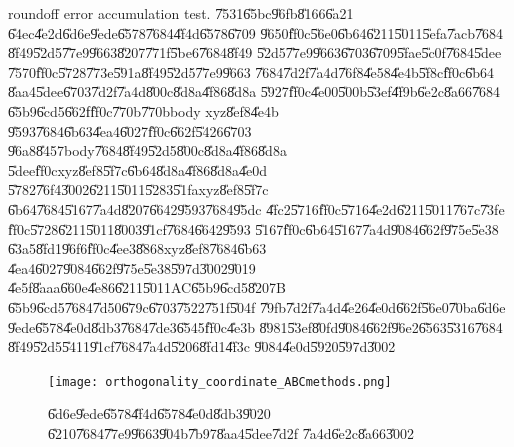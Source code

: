 \begin{case}
roundoff error accumulation test. \U{7531}\U{65bc}\U{96fb}\U{8166}\U{6a21}%
\U{64ec}\U{4e2d}\U{6d6e}\U{9ede}\U{6578}\U{7684}\U{4f4d}\U{6578}\U{6709}%
\U{9650}\U{ff0c}\U{56e0}\U{6b64}\U{6211}\U{5011}\U{5efa}\U{7acb}\U{7684}%
\U{8f49}\U{52d5}\U{77e9}\U{9663}\U{8207}\U{771f}\U{5be6}\U{7684}\U{8f49}%
\U{52d5}\U{77e9}\U{9663}\U{6703}\U{6709}\U{5fae}\U{5c0f}\U{7684}\U{5dee}%
\U{7570}\U{ff0c}\U{5728}\U{773e}\U{591a}\U{8f49}\U{52d5}\U{77e9}\U{9663}%
\U{7684}\U{7d2f}\U{7a4d}\U{76f8}\U{4e58}\U{4e4b}\U{5f8c}\U{ff0c}\U{6b64}%
\U{8aa4}\U{5dee}\U{6703}\U{7d2f}\U{7a4d}\U{800c}\U{8d8a}\U{4f86}\U{8d8a}%
\U{5927}\U{ff0c}\U{4e00}\U{500b}\U{53ef}\U{4f9b}\U{6e2c}\U{8a66}\U{7684}%
\U{65b9}\U{6cd5}\U{662f}\U{ff0c}\U{770b}\U{770b}body xyz\U{8ef8}\U{4e4b}%
\U{9593}\U{7684}\U{6b63}\U{4ea4}\U{6027}\U{ff0c}\U{662f}\U{5426}\U{6703}%
\U{96a8}\U{8457}body\U{7684}\U{8f49}\U{52d5}\U{800c}\U{8d8a}\U{4f86}\U{8d8a}%
\U{5dee}\U{ff0c}xyz\U{8ef8}\U{5f7c}\U{6b64}\U{8d8a}\U{4f86}\U{8d8a}\U{4e0d}%
\U{5782}\U{76f4}\U{3002}\U{6211}\U{5011}\U{5283}\U{51fa}xyz\U{8ef8}\U{5f7c}%
\U{6b64}\U{7684}\U{5167}\U{7a4d}\U{8207}\U{6642}\U{9593}\U{7684}\U{95dc}%
\U{4fc2}\U{5716}\U{ff0c}\U{5716}\U{4e2d}\U{6211}\U{5011}\U{767c}\U{73fe}%
\U{ff0c}\U{5728}\U{6211}\U{5011}\U{8003}\U{91cf}\U{7684}\U{6642}\U{9593}%
\U{5167}\U{ff0c}\U{6b64}\U{5167}\U{7a4d}\U{9084}\U{662f}\U{975e}\U{5e38}%
\U{63a5}\U{8fd1}\U{96f6}\U{ff0c}\U{4ee3}\U{8868}xyz\U{8ef8}\U{7684}\U{6b63}%
\U{4ea4}\U{6027}\U{9084}\U{662f}\U{975e}\U{5e38}\U{597d}\U{3002}\U{9019}%
\U{4e5f}\U{8aaa}\U{660e}\U{4e86}\U{6211}\U{5011}AC\U{65b9}\U{6cd5}\U{8207}B%
\U{65b9}\U{6cd5}\U{7684}\U{7d50}\U{679c}\U{6703}\U{7522}\U{751f}\U{504f}%
\U{79fb}\U{7d2f}\U{7a4d}\U{4e26}\U{4e0d}\U{662f}\U{56e0}\U{70ba}\U{6d6e}%
\U{9ede}\U{6578}\U{4e0d}\U{8db3}\U{7684}\U{7de3}\U{6545}\U{ff0c}\U{4e3b}%
\U{8981}\U{53ef}\U{80fd}\U{9084}\U{662f}\U{96e2}\U{6563}\U{5316}\U{7684}%
\U{8f49}\U{52d5}\U{5411}\U{91cf}\U{7684}\U{7a4d}\U{5206}\U{8fd1}\U{4f3c}%
\U{9084}\U{4e0d}\U{5920}\U{597d}\U{3002}
\end{case}

\begin{figure}[th]
\caption{\U{6d6e}\U{9ede}\U{6578}\U{4f4d}\U{6578}\U{4e0d}\U{8db3}\U{9020}%
\U{6210}\U{7684}\U{77e9}\U{9663}\U{904b}\U{7b97}\U{8aa4}\U{5dee}\U{7d2f}%
\U{7a4d}\U{6e2c}\U{8a66}\U{3002}}
\begin{center}
\texttt{[image: orthogonality\_coordinate\_ABCmethods.png]}
\end{center}
\end{figure}


